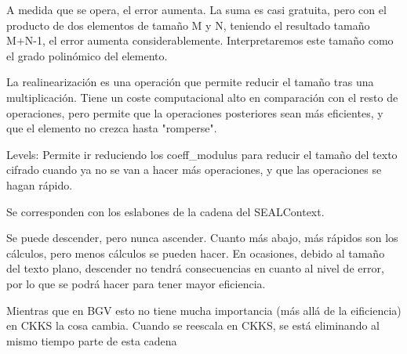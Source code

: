 A medida que se opera, el error aumenta. La suma es casi gratuita, pero con el producto de dos elementos de tamaño M y N, teniendo el resultado tamaño M+N-1, el error aumenta considerablemente. Interpretaremos este tamaño como el grado polinómico del elemento.

La realinearización es una operación que permite reducir el tamaño tras una multiplicación. Tiene un coste computacional alto en comparación con el resto de operaciones, pero permite que la operaciones posteriores sean más eficientes, y que el elemento no crezca hasta "romperse".


Levels: Permite ir reduciendo los coeff\_modulus para reducir el tamaño del texto cifrado cuando ya no se van a hacer más operaciones, y que las operaciones se hagan rápido.

Se corresponden con los eslabones de la cadena del SEALContext.




Se puede descender, pero nunca ascender. Cuanto más abajo, más rápidos son los cálculos, pero menos cálculos se pueden hacer. En ocasiones, debido al tamaño del texto plano, descender no tendrá consecuencias en cuanto al nivel de error, por lo que se podrá hacer para tener mayor eficiencia.

Mientras que en BGV esto no tiene mucha importancia (más allá de la eificiencia) en CKKS la cosa cambia. Cuando se reescala en CKKS, se está eliminando al mismo tiempo parte de esta cadena

